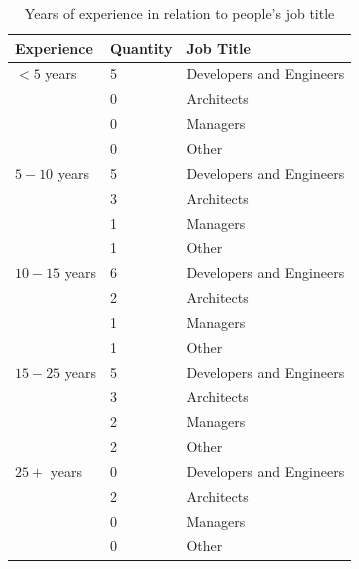 \documentclass{cslthse-msc}
\begin{document}
    \begin{table}[H]
        \centering
        \caption{Years of experience in relation to people's job title}
        \label{tab:jobExp}
        \begin{tabularx}{\columnwidth}{l l X}
            \textbf{Experience} &  \textbf{Quantity}        & \textbf{Job Title} \\ \hline
            $< 5$ years	    &   5   &	Developers and Engineers \\
            &   0   &	Architects \\
            &   0   &	Managers \\ \
	    &   0   &	Other \\ \hline
            $5 - 10$ years	&   5   &	Developers and Engineers \\
            &   3   &	Architects \\
            &   1   &	Managers \\
            &   1   &	Other \\ \hline
            $10 - 15$ years	&   6   &	Developers and Engineers \\
            &   2   &	Architects \\
            &   1   &	Managers \\
            &   1   &	Other \\ \hline
            $15 - 25$ years	&   5   &	Developers and Engineers \\
            &   3   &	Architects \\
            &   2   &	Managers \\ \
	&   2   &	Other \\ \hline
            $25+$ years	&0&	Developers and Engineers \\
            &   2   &	Architects \\
            &   0   &	Managers \\
            &   0   &	Other \\ \hline
        \end{tabularx}
    \end{table}
\end{document}
